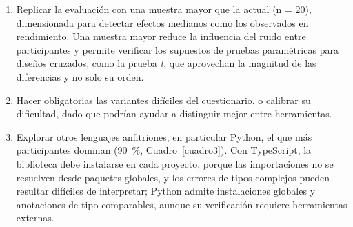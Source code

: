 \begin{enumerate}
\item Replicar la evaluación con una muestra mayor que la actual (n = 20), dimensionada para detectar efectos medianos como los observados en rendimiento. Una muestra mayor reduce la influencia del ruido entre participantes y permite verificar los supuestos de pruebas paramétricas para diseños cruzados, como la prueba \emph{t}, que aprovechan la magnitud de las diferencias y no solo su orden.
\item Hacer obligatorias las variantes difíciles del cuestionario, o calibrar su dificultad, dado que podrían ayudar a distinguir mejor entre herramientas.
\item Explorar otros lenguajes anfitriones, en particular Python, el que más participantes dominan (90~\%, Cuadro~\ref{cuadro3}). Con TypeScript, la biblioteca debe instalarse en cada proyecto, porque las importaciones no se resuelven desde paquetes globales, y los errores de tipos complejos pueden resultar difíciles de interpretar; Python admite instalaciones globales y anotaciones de tipo comparables, aunque su verificación requiere herramientas externas.
\end{enumerate}
